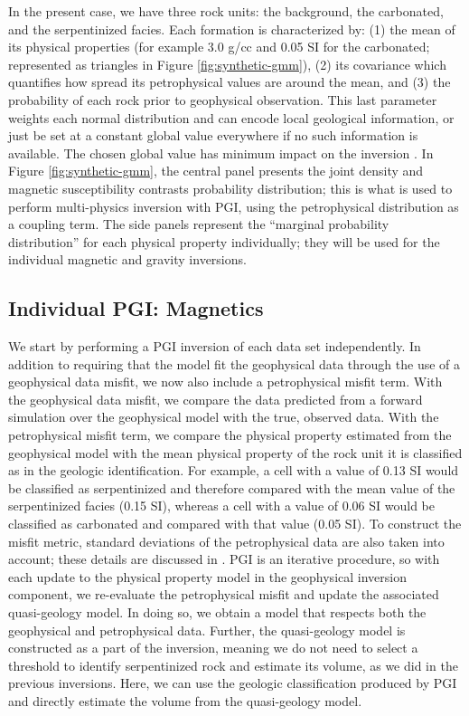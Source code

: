 \documentclass[
    paper,
  ]{geophysics}
\begin{document}
In the present case, we have three rock units: the background, the carbonated, and the serpentinized facies. Each formation is characterized by: (1) the mean of its physical properties (for example 3.0 g/cc and 0.05 SI for the carbonated; represented as triangles in Figure \ref{fig:synthetic-gmm}), (2) its covariance which quantifies how spread its petrophysical values are around the mean, and (3) the probability of each rock prior to geophysical observation. This last parameter weights each normal distribution and can encode local geological information, or just be set at a constant global value everywhere if no such information is available. The chosen global value has minimum impact on the inversion \citep{AsticThesis}. In Figure \ref{fig:synthetic-gmm}, the central panel presents the joint density and magnetic susceptibility contrasts probability distribution; this is what is used to perform multi-physics inversion with PGI, using the petrophysical distribution as a coupling term. The side panels represent the ``marginal probability distribution'' for each physical property individually; they will be used for the individual magnetic and gravity inversions.





\subsection{Individual PGI: Magnetics}
We start by performing a PGI inversion of each data set independently. In addition to requiring that the model fit the geophysical data through the use of a geophysical data misfit, we now also include a petrophysical misfit term. With the geophysical data misfit, we compare the data predicted from a forward simulation over the geophysical model with the true, observed data. With the petrophysical misfit term, we compare the physical property estimated from the geophysical model with the mean physical property of the rock unit it is classified as in the geologic identification. For example, a cell with a value of 0.13 SI would be classified as serpentinized and therefore compared with the mean value of the serpentinized facies (0.15 SI), whereas a cell with a value of 0.06 SI would be classified as carbonated and compared with that value (0.05 SI). To construct the misfit metric, standard deviations of the petrophysical data are also taken into account; these details are discussed in \cite{Astic2019}. PGI is an iterative procedure, so with each update to the physical property model in the geophysical inversion component, we re-evaluate the petrophysical misfit and update the associated quasi-geology model. In doing so, we obtain a model that respects both the geophysical and petrophysical data. Further, the quasi-geology model is constructed as a part of the inversion, meaning we do not need to select a threshold to identify serpentinized rock and estimate its volume, as we did in the previous inversions. Here, we can use the geologic classification produced by PGI and directly estimate the volume from the quasi-geology model.
\end{document}
